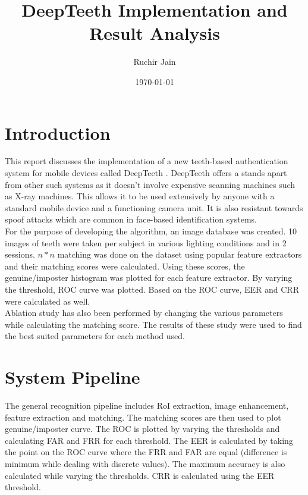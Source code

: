 \documentclass{article}
\title{DeepTeeth Implementation and Result Analysis} %
\author{Ruchir Jain} %
\date{\today} %
\begin{document}

\maketitle %

\section{Introduction}
This report discusses the implementation of a new teeth-based authentication system for mobile devices called DeepTeeth \citep{arora2021deepteeth}. DeepTeeth offers a stands apart from other such systems as it doesn't involve expensive scanning machines such as X-ray machines. This allows it to be used extensively by anyone with a standard mobile device and a functioning camera unit. It is also resistant towards spoof attacks which are common in face-based identification systems.\\ 
For the purpose of developing the algorithm, an image database was created. 10 images of teeth were taken per subject in various lighting conditions and in 2 sessions. $n * n$ matching was done on the dataset using popular feature extractors and their matching scores were calculated. Using these scores, the genuine/imposter histogram was plotted for each feature extractor. By varying the threshold, ROC curve was plotted. Based on the ROC curve, EER and CRR were calculated as well.\\
Ablation study has also been performed by changing the various parameters while calculating the matching score. The results of these study were used to find the best suited parameters for each method used.

\section{System Pipeline}
The general recognition pipeline includes RoI extraction, image enhancement, feature extraction and matching. The matching scores are then used to plot genuine/imposter curve. The ROC is plotted by varying the thresholds and calculating FAR and FRR for each threshold. The EER is calculated by taking the point on the ROC curve where the FRR and FAR are equal (difference is minimum while dealing with discrete values). The maximum accuracy is also calculated while varying the thresholds. CRR is calculated using the EER threshold.
\end{document}
